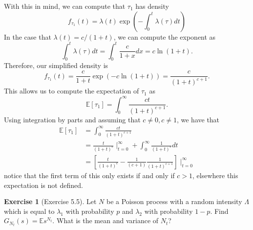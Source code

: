 \documentclass[12pt]{article}
\newcommand{\Expect}{\mathbb{E}}
\theoremstyle{definition}
\newtheorem{exer}{Exercise}
\theoremstyle{remark}
\begin{document}
With this in mind, we can compute that $\tau_{1}$ has density
\begin{equation*}
    f_{\tau_{1}}(t) = \lambda(t) \exp\left( - \int_{0}^{t} \lambda(\tau)dt \right)
\end{equation*}
In the case that $\lambda(t) = c / (1 + t)$, we can compute the exponent as 
\begin{equation*}
    \int_{0}^{t} \lambda(\tau)dt  = \int_{0}^{t} \frac{c}{1+x} dx = c \ln(1 + t).
\end{equation*}
Therefore, our simplified density is 
\begin{equation*}
    f_{\tau_{1}}(t) = \frac{c}{1+t} \exp(-c \ln(1 + t)) = \frac{c}{(1+t)^{c+1}}.
\end{equation*}
This allows us to compute the expectation of $\tau_{1}$ as 
\begin{equation*}
    \Expect[\tau_{1}] = \int_{0}^{\infty} \frac{ct}{(1+t)^{c+1}}.
\end{equation*}
Using integration by parts and assuming that $c\neq 0, c\neq 1$, we have that
\begin{align*}
    \Expect[\tau_{1}] &= \int_{0}^{\infty} \frac{ct}{(1+t)^{c+1}}\\
                      &= \frac{t}{(1+t)^{c}}  \mid_{t=0}^{\infty } 
                      + \int_{0}^{\infty} \frac{1}{(1+t)^{c}}dt\\
                      &=  \left[ \frac{t}{(1+t)^{c}} - \frac{1}{(c+1)} \frac{1}{(1+t)^{c+1}} \right] \mid_{t=0}^{\infty } 
\end{align*}
notice that the first term of this only exists if and only if $c > 1$, elsewhere this expectation is not defined.
\newpage 

\begin{exer}[Exercise 5.5]
    Let $N$ be a Poisson process with a random intensity  $\Lambda$ which is equal to  $\lambda_{1}$ with probability $p$ and $\lambda_{2}$ with probability $1-p$. Find $G_{N_{t}}(s) = \Expect s^{N_{t}}$. What is the mean and variance of $N_{t}$?
\end{exer}
\end{document}
